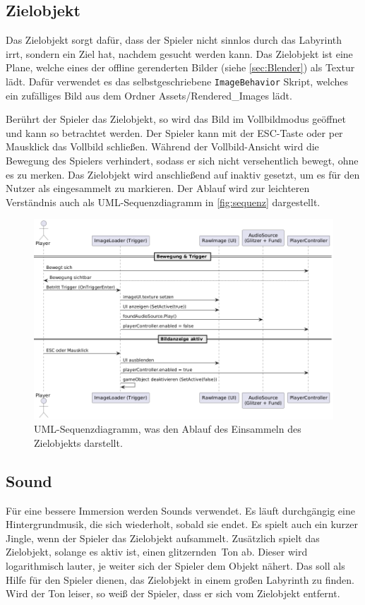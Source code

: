 \documentclass[a4paper]{article}
\begin{document}
\subsection{Zielobjekt}
Das Zielobjekt sorgt dafür, dass der Spieler nicht sinnlos durch das Labyrinth irrt, sondern ein Ziel hat, nachdem gesucht werden kann. Das Zielobjekt ist eine Plane, welche eines der offline gerenderten Bilder (siehe \autoref{sec:Blender}) als Textur lädt. Dafür verwendet es das selbstgeschriebene \texttt{ImageBehavior} Skript, welches ein zufälliges Bild aus dem Ordner Assets/Rendered\_Images lädt.

Berührt der Spieler das Zielobjekt, so wird das Bild im Vollbildmodus geöffnet und kann so betrachtet werden. Der Spieler kann mit der ESC-Taste oder per Mausklick das Vollbild schließen. Während der Vollbild-Ansicht wird die Bewegung des Spielers verhindert, sodass er sich nicht versehentlich bewegt, ohne es zu merken. Das Zielobjekt wird anschließend auf inaktiv gesetzt, um es für den Nutzer als eingesammelt zu markieren. Der Ablauf wird zur leichteren Verständnis auch als UML-Sequenzdiagramm in \autoref{fig:sequenz} dargestellt.

\begin{figure}[h]
	\centering
	\includegraphics[width=0.7\linewidth]{img/UML.png}
	\caption{UML-Sequenzdiagramm, was den Ablauf des Einsammeln des Zielobjekts darstellt.}
	\label{fig:sequenz}
\end{figure}

\subsection{Sound}
Für eine bessere Immersion werden Sounds verwendet. Es läuft durchgängig eine Hintergrundmusik, die sich wiederholt, sobald sie endet. Es spielt auch ein kurzer Jingle, wenn der Spieler das Zielobjekt aufsammelt. Zusätzlich spielt das Zielobjekt, solange es aktiv ist, einen \glqq glitzernden\grqq\ Ton ab. Dieser wird logarithmisch lauter, je weiter sich der Spieler dem Objekt nähert. Das soll als Hilfe für den Spieler dienen, das Zielobjekt in einem großen Labyrinth zu finden. Wird der Ton leiser, so weiß der Spieler, dass er sich vom Zielobjekt entfernt.
\end{document}
